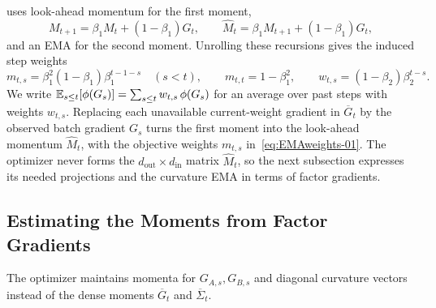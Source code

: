  uses look-ahead momentum for the first moment,
\[
  M_{t+1}=\beta_1M_t+(1-\beta_1)G_t,
  \qquad
  \widehat M_t=\beta_1M_{t+1}+(1-\beta_1)G_t,
\]
and an EMA for the second moment. Unrolling these recursions
gives the induced step weights
\begin{equation}\label{eq:EMAweights-01}
  m_{t,s}=\beta_1^2(1-\beta_1)\beta_1^{t-1-s}
  \quad(s<t),
  \qquad
  m_{t,t}=1-\beta_1^2,
  \qquad
  w_{t,s}=(1-\beta_2)\beta_2^{t-s}.
\end{equation}
We write $\mathbb{E}_{s\le t}[\phi(G_s)]=\sum_{s\le t}w_{t,s}\,\phi(G_s)$ for an
average over past steps with weights $w_{t,s}$. Replacing each unavailable
current-weight gradient in $\overline G_t$ by the observed batch gradient
$G_s$ turns the first moment into the look-ahead momentum $\widehat M_t$,
with the objective weights $m_{t,s}$ in~\eqref{eq:EMAweights-01}. The
optimizer never forms the $d_{\mathrm{out}}\times d_{\mathrm{in}}$ matrix
$\widehat M_t$, so the next subsection expresses its needed projections and
the curvature EMA in terms of factor gradients.

\subsection{Estimating the Moments from Factor Gradients}
\label{sec:weighted-estimation-01}

The optimizer maintains momenta for $G_{A,s},G_{B,s}$ and diagonal
curvature vectors instead of the dense moments $\overline G_t$ and
$\overline\Sigma_t$.

